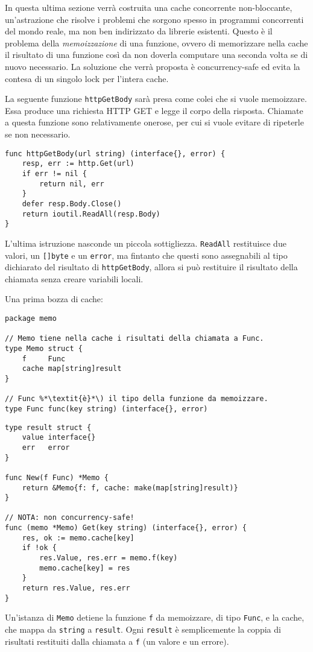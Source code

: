 %
In questa ultima sezione verrà costruita una cache concorrente non-bloccante, un'astrazione che risolve i problemi che sorgono spesso in programmi concorrenti del mondo reale, ma non ben indirizzato da librerie esistenti.
Questo è il problema della \textit{memoizzazione} di una funzione, ovvero di memorizzare nella cache il risultato di una funzione così da non doverla computare una seconda volta se di nuovo necessario.
La soluzione che verrà proposta è concurrency-safe ed evita la contesa di un singolo lock per l'intera cache.

La seguente funzione \verb|httpGetBody| sarà presa come colei che si vuole memoizzare.
Essa produce una richiesta HTTP GET e legge il corpo della risposta.
Chiamate a questa funzione sono relativamente onerose, per cui si vuole evitare di ripeterle se non necessario.
\begin{lstlisting}[frame=single, label={lst:lstlisting9-7.1}]
func httpGetBody(url string) (interface{}, error) {
    resp, err := http.Get(url)
    if err != nil {
        return nil, err
    }
    defer resp.Body.Close()
    return ioutil.ReadAll(resp.Body)
}
\end{lstlisting}
L'ultima istruzione nasconde un piccola sottigliezza.
\verb|ReadAll| restituisce due valori, un \verb|[]byte| e un \verb|error|, ma fintanto che questi sono assegnabili al tipo dichiarato del risultato di \verb|httpGetBody|, allora si può restituire il risultato della chiamata senza creare variabili locali.

Una prima bozza di cache:
\begin{lstlisting}[frame=single, label={lst:lstlisting9-7.2}]
package memo

// Memo tiene nella cache i risultati della chiamata a Func.
type Memo struct {
    f     Func
    cache map[string]result
}

// Func %*\textit{è}*\) il tipo della funzione da memoizzare.
type Func func(key string) (interface{}, error)
\end{lstlisting}
\begin{lstlisting}[frame=single, label={lst:lstlisting9-7.3}]
type result struct {
    value interface{}
    err   error
}

func New(f Func) *Memo {
    return &Memo{f: f, cache: make(map[string]result)}
}

// NOTA: non concurrency-safe!
func (memo *Memo) Get(key string) (interface{}, error) {
    res, ok := memo.cache[key]
    if !ok {
        res.Value, res.err = memo.f(key)
        memo.cache[key] = res
    }
    return res.Value, res.err
}
\end{lstlisting}
Un'istanza di \verb|Memo| detiene la funzione \verb|f| da memoizzare, di tipo \verb|Func|, e la cache, che mappa da \verb|string| a \verb|result|.
Ogni \verb|result| è semplicemente la coppia di risultati restituiti dalla chiamata a \verb|f| (un valore e un errore).

